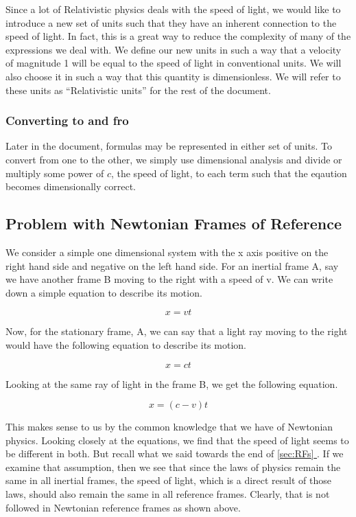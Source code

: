 \documentclass[12pt]{article}
\newcommand*{\fullref}[1]{\hyperref[{#1}]{\autoref*{#1} \nameref*{#1}}}
\numberwithin{equation}{section}
\theoremstyle{plain}
\theoremstyle{definition}
\begin{document}
Since a lot of Relativistic physics deals with the speed of light, we would like to introduce a new set of units such that they have an inherent connection to the speed of light. In fact, this is a great way to reduce the complexity of many of the expressions we deal with. We define our new units in such a way that a velocity of magnitude 1 will be equal to the speed of light in conventional units. We will also choose it in such a way that this quantity is dimensionless. We will refer to these units as ``Relativistic units'' for the rest of the document.

\subsubsection*{Converting to and fro}

Later in the document, formulas may be represented in either set of units. To convert from one to the other, we simply use dimensional analysis and divide or multiply some power of $c$, the speed of light, to each term such that the eqaution becomes dimensionally correct.

\subsection{Problem with Newtonian Frames of Reference}

We consider a simple one dimensional system with the x axis positive on the right hand side and negative on the left hand side. For an inertial frame A, say we have another frame B moving to the right with a speed of v. We can write down a simple equation to describe its motion.

\begin{equation}
    x = vt
\end{equation}

Now, for the stationary frame, A, we can say that a light ray moving to the right would have the following equation to describe its motion.

\begin{equation}
    x = ct
\end{equation}

Looking at the same ray of light in the frame B, we get the following equation.

\begin{equation}
    x = (c - v)t
\end{equation}

This makes sense to us by the common knowledge that we have of Newtonian physics. Looking closely at the equations, we find that the speed of light seems to be different in both. But recall what we said towards the end of \fullref{sec:RFs}. If we examine that assumption, then we see that since the laws of physics remain the same in all inertial frames, the speed of light, which is a direct result of those laws, should also remain the same in all reference frames. Clearly, that is not followed in Newtonian reference frames as shown above.
\end{document}
